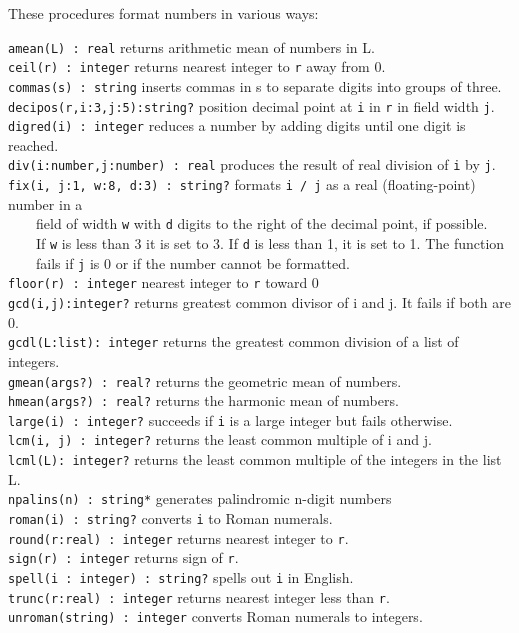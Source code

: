 These procedures format numbers in various ways:

\texttt{amean(L) : real} returns arithmetic mean of
numbers in L.\\
\texttt{ceil(r) : integer} returns nearest integer to
\texttt{r} away from 0.\\
\texttt{commas(s) : string} inserts commas in s to separate digits into
groups of three.\\
\texttt{decipos(r,i:3,j:5):string?} position decimal point at \texttt{i}
in \texttt{r} in field width \texttt{j}.\\
\texttt{digred(i) : integer} reduces a number by adding digits until one
digit is reached.\\
\texttt{div(i:number,j:number) : real} produces the result of real
division of \texttt{i} by \texttt{j}.\\
\texttt{fix(i, j:1, w:8, d:3) : string?} formats \texttt{i / j} as a
real (floating-point) number in a\\
 \ \ \ \ field of width \texttt{w} with \texttt{d} digits to
the right of the decimal point, if possible.\\
 \ \ \ \ If \texttt{w} is less than 3 it is set to 3. If \texttt{d} is
less than 1, it is set to 1. The function\\
 \ \ \ \  fails if \texttt{j}
is 0 or if the number cannot be formatted.\\
\texttt{floor(r)}\texttt{ : integer} nearest integer to
\texttt{r} toward 0\\
\texttt{gcd(i,j):integer?} returns greatest common divisor of i and j.
It fails if both are 0.\\
\texttt{gcdl(L:list): integer} returns the greatest common division of a
list of integers.\\
\texttt{gmean(args?) : real?} returns the geometric mean of
numbers.\\
\texttt{hmean(args?) : real?} returns the harmonic mean of
numbers.\\
\texttt{large(i) : integer?} succeeds if \texttt{i} is a large integer
but fails otherwise.\\
\texttt{lcm(i, j) : integer?} returns the least common multiple of i and
j.\\
\texttt{lcml(L): integer?} returns the least common multiple of the
integers in the list L.\\
\texttt{npalins(n) : string*} generates palindromic n-digit
numbers\\
\texttt{roman(i) : string?} converts \texttt{i} to Roman numerals.\\
\texttt{round(r:real) : integer} returns nearest integer to
\texttt{r}.\\
\texttt{sign(r) : integer} returns sign of \texttt{r}.\\
\texttt{spell(i : integer) : string?} spells out \texttt{i} in
English.\\
\texttt{trunc(r:real) : integer} returns nearest integer less than
\texttt{r}.\\
\texttt{unroman(string) : integer} converts Roman numerals to integers.

